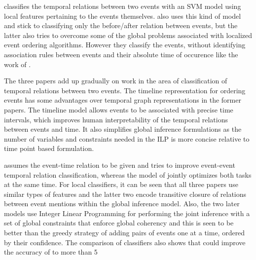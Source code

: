 \citeauthor{chju2008ec} classifies the temporal relations between two events with an SVM model using local features pertaining to the events themselves. \citeauthor{temporalordering} also uses this kind of model and stick to classifying only the before/after relation between events, but the latter also tries to overcome some of the global problems associated with localized event ordering algorithms. However they classify the events, without identifying association rules between events and their absolute time of occurence like the work of \citeauthor{quang}.

The three papers add up gradually on work in the area of classification of temporal relations between two events. The timeline representation for ordering events has some advantages over temporal graph representations in the former papers. The timeline model allows events to be associated with precise time intervals, which improves human interpretability of the temporal relations between events and time. It also simplifies global inference formulations as the number of variables and constraints needed in the ILP is more concise relative to time point based formulation.  

\citeauthor{temporalordering} assumes the event-time relation to be given and tries to improve event-event temporal relation classification, whereas the model of \citeauthor{quang} jointly optimizes both tasks at the same time. For local classifiers, it can be seen that all three papers use similar types of features and the latter two encode transitive closure of relations between event mentions within the global inference model. Also, the two later models use Integer Linear Programming for performing the joint inference with a set of global constraints that enforce global coherency and this is seen to be better than the greedy strategy of adding pairs of events one at a time, ordered by their confidence. The comparison of classifiers also shows that \citeauthor{quang} could improve the accuracy of \citeauthor{temporalordering} to more than 5%
